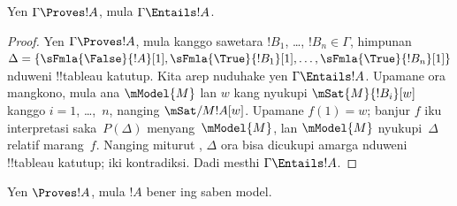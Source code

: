 \documentclass[../../../include/open-logic-section]{subfiles}
\begin{document}
\begin{cor}
Yen $\Gamma \Proves !A$, mula $\Gamma \Entails !A$.
\end{cor}

\begin{proof}
  Yen $\Gamma \Proves !A$, mula kanggo sawetara $!B_1$, \dots,
  $!B_n \in \Gamma$, himpunan $\Delta = \{\sFmla{\False}{!A}[1],
  \sFmla{\True}{!B_1}[1], \dots, \sFmla{\True}{!B_n}[1]\}$ nduweni
  !!{tableau} katutup. Kita arep nuduhake yen $\Gamma \Entails !A$.
  Upamane ora mangkono, mula ana $\mModel{M}$ lan $w$ kang nyukupi
  $\mSat{M}{!B_i}[w]$ kanggo $i=1$, \dots,~$n$, nanging
  $\mSat/{M}{!A}[w]$. Upamane $f(1) = w$; banjur $f$ iku interpretasi
  saka~$P(\Delta)$ menyang~$\mModel{M}$, lan $\mModel{M}$ nyukupi~$\Delta$
  relatif marang~$f$. Nanging miturut
  , $\Delta$ ora bisa dicukupi amarga
  nduweni !!{tableau} katutup; iki kontradiksi. Dadi mesthi
  $\Gamma \Entails !A$.
\end{proof}

\begin{cor}
Yen $\Proves !A$, mula $!A$ bener ing saben model.
\end{cor}
\end{document}
